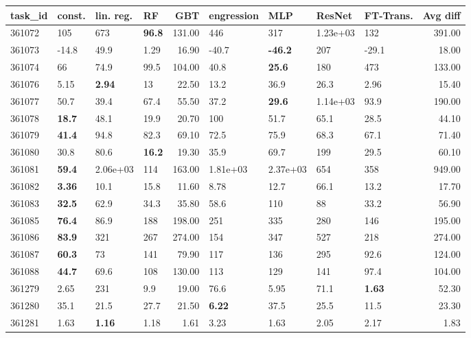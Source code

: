 \begin{table}[ht!]
\centering
\begingroup\footnotesize
\begin{tabular}{llllrllllr}
  \hline
\hline
task\_id & const. & lin. reg. & RF & GBT & engression & MLP & ResNet & FT-Trans. & Avg diff \\ 
  \hline
361072 & 105 & 673 & \textbf{96.8} & 131.00 & 446 & 317 & 1.23e+03 & 132 & 391.00 \\ 
  361073 & -14.8 & 49.9 & 1.29 & 16.90 & -40.7 & \textbf{-46.2} & 207 & -29.1 & 18.00 \\ 
  361074 & 66 & 74.9 & 99.5 & 104.00 & 40.8 & \textbf{25.6} & 180 & 473 & 133.00 \\ 
  361076 & 5.15 & \textbf{2.94} & 13 & 22.50 & 13.2 & 36.9 & 26.3 & 2.96 & 15.40 \\ 
  361077 & 50.7 & 39.4 & 67.4 & 55.50 & 37.2 & \textbf{29.6} & 1.14e+03 & 93.9 & 190.00 \\ 
  361078 & \textbf{18.7} & 48.1 & 19.9 & 20.70 & 100 & 51.7 & 65.1 & 28.5 & 44.10 \\ 
  361079 & \textbf{41.4} & 94.8 & 82.3 & 69.10 & 72.5 & 75.9 & 68.3 & 67.1 & 71.40 \\ 
  361080 & 30.8 & 80.6 & \textbf{16.2} & 19.30 & 35.9 & 69.7 & 199 & 29.5 & 60.10 \\ 
  361081 & \textbf{59.4} & 2.06e+03 & 114 & 163.00 & 1.81e+03 & 2.37e+03 & 654 & 358 & 949.00 \\ 
  361082 & \textbf{3.36} & 10.1 & 15.8 & 11.60 & 8.78 & 12.7 & 66.1 & 13.2 & 17.70 \\ 
  361083 & \textbf{32.5} & 62.9 & 34.3 & 35.80 & 58.6 & 110 & 88 & 33.2 & 56.90 \\ 
  361085 & \textbf{76.4} & 86.9 & 188 & 198.00 & 251 & 335 & 280 & 146 & 195.00 \\ 
  361086 & \textbf{83.9} & 321 & 267 & 274.00 & 154 & 347 & 527 & 218 & 274.00 \\ 
  361087 & \textbf{60.3} & 73 & 141 & 79.90 & 117 & 136 & 295 & 92.6 & 124.00 \\ 
  361088 & \textbf{44.7} & 69.6 & 108 & 130.00 & 113 & 129 & 141 & 97.4 & 104.00 \\ 
  361279 & 2.65 & 231 & 9.9 & 19.00 & 76.6 & 5.95 & 71.1 & \textbf{1.63} & 52.30 \\ 
  361280 & 35.1 & 21.5 & 27.7 & 21.50 & \textbf{6.22} & 37.5 & 25.5 & 11.5 & 23.30 \\ 
  361281 & 1.63 & \textbf{1.16} & 1.18 & 1.61 & 3.23 & 1.63 & 2.05 & 2.17 & 1.83 \\ 

\end{tabular}
\end{table}
